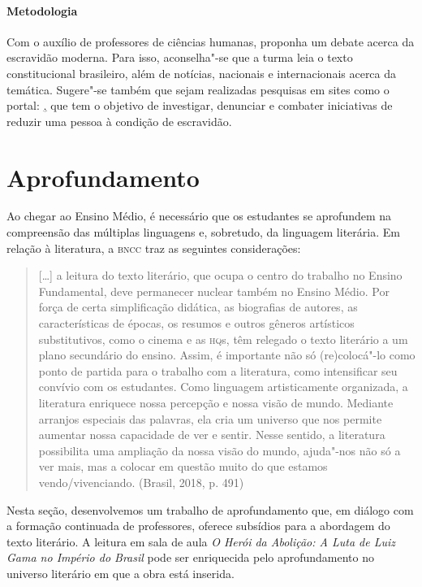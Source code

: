 \documentclass[12pt]{extarticle}
\begin{document}
\paragraph{Metodologia} Com o auxílio de professores de ciências humanas, 
proponha um debate acerca da escravidão moderna.
Para isso, aconselha"-se que a turma leia o texto constitucional
brasileiro, além de notícias, nacionais e internacionais acerca da
temática. Sugere"-se também que sejam realizadas pesquisas em sites como
o portal:
\href{https://www.freedomunited.org/}, que tem o objetivo de investigar, denunciar e combater iniciativas de reduzir uma pessoa à condição de escravidão.


\section{Aprofundamento}

Ao chegar ao Ensino Médio, é necessário que os estudantes se aprofundem
na compreensão das múltiplas linguagens e, sobretudo, da linguagem
literária. Em relação à literatura, a \textsc{bncc} traz as seguintes
considerações:

\begin{quote}
{[}\ldots{}{]} a leitura do texto literário, que ocupa o centro do trabalho
no Ensino Fundamental, deve permanecer nuclear também no Ensino Médio.
Por força de certa simplificação didática, as biografias de autores, as
características de épocas, os resumos e outros gêneros artísticos
substitutivos, como o cinema e as \textsc{hq}s, têm relegado o texto literário a
um plano secundário do ensino. Assim, é importante não só (re)colocá"-lo
como ponto de partida para o trabalho com a literatura, como
intensificar seu convívio com os estudantes. Como linguagem
artisticamente organizada, a literatura enriquece nossa percepção e
nossa visão de mundo. Mediante arranjos especiais das palavras, ela cria
um universo que nos permite aumentar nossa capacidade de ver e sentir.
Nesse sentido, a literatura possibilita uma ampliação da nossa visão do
mundo, ajuda"-nos não só a ver mais, mas a colocar em questão muito do
que estamos vendo/vivenciando. (Brasil, 2018, p. 491)
\end{quote}

Nesta seção, desenvolvemos um trabalho de aprofundamento que, em diálogo
com a formação continuada de professores, oferece subsídios para a
abordagem do texto literário. A leitura em sala de aula \emph{O Herói da
Abolição: A Luta de Luiz Gama no Império do Brasil} pode ser enriquecida
pelo aprofundamento no universo literário em que a obra está inserida.
\end{document}
